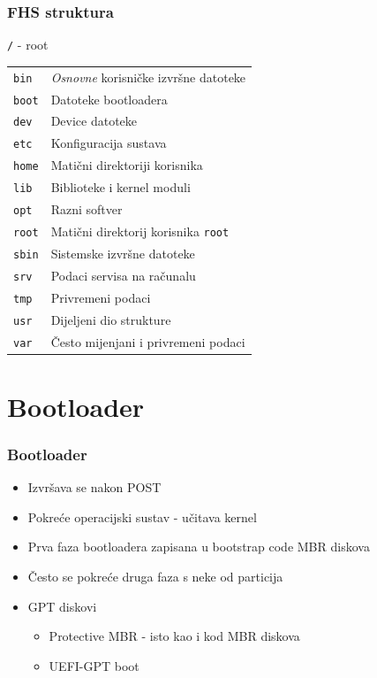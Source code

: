 \documentclass[t]{beamer}
\begin{document}
\begin{frame}
	\frametitle{FHS struktura}
	\texttt{/} - root\\
	\begin{tabular}{p{3cm} l}
		\texttt{bin} & \emph{Osnovne} korisničke izvršne datoteke \\
		\texttt{boot} & Datoteke bootloadera \\
		\texttt{dev} & Device datoteke \\
		\texttt{etc} & Konfiguracija sustava \\
		\texttt{home} & Matični direktoriji korisnika \\
		\texttt{lib} & Biblioteke i kernel moduli \\
		\texttt{opt} & Razni softver \\
		\texttt{root} & Matični direktorij korisnika \texttt{root} \\
		\texttt{sbin} & Sistemske izvršne datoteke \\
		\texttt{srv} & Podaci servisa na računalu \\
		\texttt{tmp} & Privremeni podaci \\
		\texttt{usr} & Dijeljeni dio strukture \\
		\texttt{var} & Često mijenjani i privremeni podaci 
	\end{tabular}
\end{frame}

\section{Bootloader}
\begin{frame}
	\frametitle{Bootloader}
	\begin{itemize}
		\item Izvršava se nakon POST
		\item Pokreće operacijski sustav - učitava kernel
	\end{itemize}
	
	\begin{itemize}
		\item Prva faza bootloadera zapisana u bootstrap code MBR diskova
		\item Često se pokreće druga faza s neke od particija
	\end{itemize}
	\begin{itemize}
		\item GPT diskovi
		\begin{itemize}
	 		\item Protective MBR - isto kao i kod MBR diskova
			\item UEFI-GPT boot
		\end{itemize}
	\end{itemize}
\end{frame}
\end{document}
